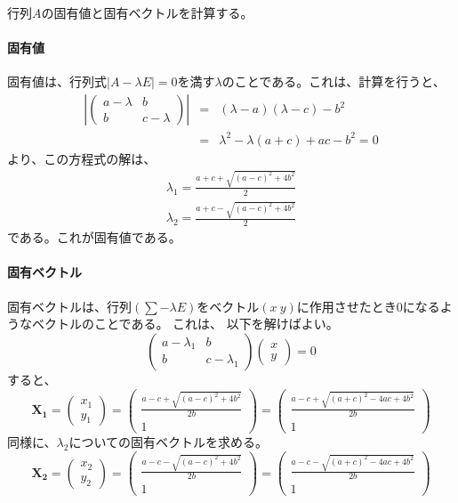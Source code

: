 行列$A$の固有値と固有ベクトルを計算する。
\paragraph{固有値}
固有値は、行列式$|A-\lambda E|=0$を満す$\lambda$のことである。これは、計算を行うと、
\begin{eqnarray*}
 \left|\begin{pmatrix}
  a-\lambda & b\\
  b & c-\lambda
  \end{pmatrix}\right| &=& (\lambda-a)(\lambda -c)-b^2 \\
 &=& \lambda^2-\lambda(a+c)+ac-b^2 =0
\end{eqnarray*}
より、この方程式の解は、
\begin{eqnarray*}
 \lambda_1 = \frac{a+c+\sqrt{(a-c)^2+4b^2}}{2} \\
 \lambda_2 = \frac{a+c-\sqrt{(a-c)^2+4b^2}}{2}
\end{eqnarray*}
である。これが固有値である。

\paragraph{固有ベクトル}
固有ベクトルは、行列$(\sum-\lambda E)$をベクトル$(x\ y)$に作用させたとき$0$になるようなベクトルのことである。
これは、
以下を解けばよい。
\begin{equation*}
 \begin{pmatrix}
  a-\lambda_1 & b  \\
 b 
& c-\lambda_1
 \end{pmatrix}
\begin{pmatrix}
 x\\
 y
\end{pmatrix}=0
\end{equation*}
すると、
\begin{equation*}
 \bm{X_1} = \begin{pmatrix}
  x_1 \\
  y_1
 \end{pmatrix} =
\begin{pmatrix}
 \frac{a-c+\sqrt{(a-c)^2+4b^2}}{2b}\\
 1
\end{pmatrix} = 
\begin{pmatrix}
 \frac{a-c+\sqrt{(a+c)^2-4ac+4b^2}}{2b}\\
 1
\end{pmatrix}
\end{equation*}
同様に、$\lambda_2$についての固有ベクトルを求める。
\begin{equation*}
 \bm{X_2}=\begin{pmatrix}
  x_2 \\
  y_2
 \end{pmatrix} =
\begin{pmatrix}
 \frac{ a-c-\sqrt{(a-c)^2+4b^2} }{2b}\\
 1
\end{pmatrix} = 
\begin{pmatrix}
 \frac{ a-c-\sqrt{(a+c)^2-4ac+4b^2} }{2b}\\
 1
\end{pmatrix}
\end{equation*}


